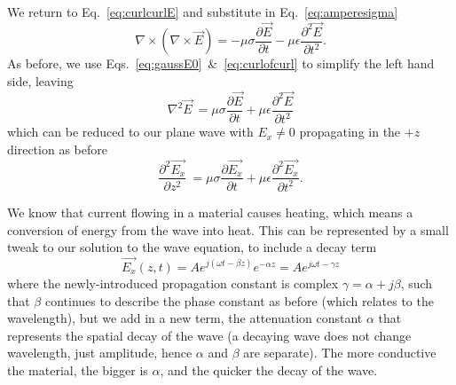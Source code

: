 \documentclass{tufte-handout}
\begin{document}
We return to Eq.~\ref{eq:curlcurlE} and substitute in Eq.~\ref{eq:amperesigma}\marginnote{\[ \nabla\times\left(\nabla\times\vec{E}\right) = \nabla\times\left(-\mu\frac{\partial \vec{H}}{\partial t} \right)\]}
\begin{equation}
\nabla\times\left(\nabla\times\vec{E}\right) = -\mu\sigma\frac{\partial \vec{E}}{\partial t}  -\mu\epsilon \frac{\partial^2\vec{E}}{\partial t^2}.
\end{equation}
As before, we use Eqs.~\ref{eq:gaussE0}~\&~\ref{eq:curlofcurl} to simplify the left hand side, leaving
\begin{equation}
\nabla^2\vec{E}\ = \mu\sigma\frac{\partial \vec{E}}{\partial t}  +\mu\epsilon \frac{\partial^2\vec{E}}{\partial t^2}\label{eq:diffEfull}
\end{equation}
which can be reduced to our plane wave with $E_x\neq0$ propagating in the $+z$ direction as before 
\begin{equation}
\frac{\partial^2\vec{E_x}}{\partial z^2}\ = \mu\sigma\frac{\partial \vec{E_x}}{\partial t}  +\mu\epsilon \frac{\partial^2\vec{E_x}}{\partial t^2}.
\label{eq:diffEfullx}
\end{equation}

We know that current flowing in a material causes heating, which means a conversion of energy from the wave into heat. This can be represented by a small tweak to our solution to the wave equation, to include a decay term
\begin{equation}
\vec{E_x}(z,t) = Ae^{j\left(\omega{}t-\beta{}z\right)}e^{-\alpha{}z} = Ae^{j\omega{}t-\gamma{}z}\label{eq:lossysolution}
\end{equation} 
where the newly-introduced propagation constant is complex $\gamma = \alpha + j\beta$, such that $\beta$ continues to describe the phase constant as before (which relates to the wavelength), but we add in a new term, the attenuation constant $\alpha$ that represents the spatial decay of the wave (a decaying wave does not change wavelength, just amplitude, hence $\alpha$ and $\beta$ are separate). The more conductive the material, the bigger is $\alpha$, and the quicker the decay of the wave. 
\end{document}

